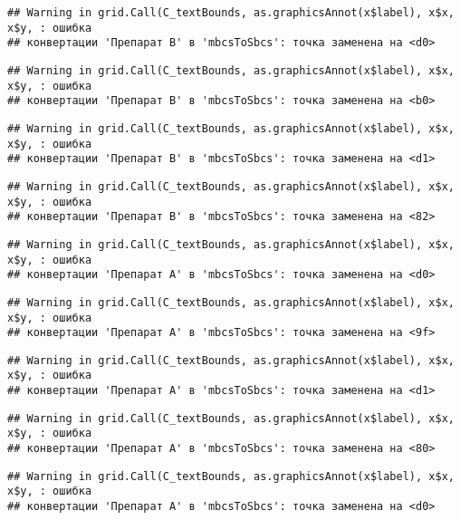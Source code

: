 \documentclass[
]{article}
\begin{document}
\begin{verbatim}
## Warning in grid.Call(C_textBounds, as.graphicsAnnot(x$label), x$x, x$y, : ошибка
## конвертации 'Препарат B' в 'mbcsToSbcs': точка заменена на <d0>
\end{verbatim}

\begin{verbatim}
## Warning in grid.Call(C_textBounds, as.graphicsAnnot(x$label), x$x, x$y, : ошибка
## конвертации 'Препарат B' в 'mbcsToSbcs': точка заменена на <b0>
\end{verbatim}

\begin{verbatim}
## Warning in grid.Call(C_textBounds, as.graphicsAnnot(x$label), x$x, x$y, : ошибка
## конвертации 'Препарат B' в 'mbcsToSbcs': точка заменена на <d1>
\end{verbatim}

\begin{verbatim}
## Warning in grid.Call(C_textBounds, as.graphicsAnnot(x$label), x$x, x$y, : ошибка
## конвертации 'Препарат B' в 'mbcsToSbcs': точка заменена на <82>
\end{verbatim}

\begin{verbatim}
## Warning in grid.Call(C_textBounds, as.graphicsAnnot(x$label), x$x, x$y, : ошибка
## конвертации 'Препарат A' в 'mbcsToSbcs': точка заменена на <d0>
\end{verbatim}

\begin{verbatim}
## Warning in grid.Call(C_textBounds, as.graphicsAnnot(x$label), x$x, x$y, : ошибка
## конвертации 'Препарат A' в 'mbcsToSbcs': точка заменена на <9f>
\end{verbatim}

\begin{verbatim}
## Warning in grid.Call(C_textBounds, as.graphicsAnnot(x$label), x$x, x$y, : ошибка
## конвертации 'Препарат A' в 'mbcsToSbcs': точка заменена на <d1>
\end{verbatim}

\begin{verbatim}
## Warning in grid.Call(C_textBounds, as.graphicsAnnot(x$label), x$x, x$y, : ошибка
## конвертации 'Препарат A' в 'mbcsToSbcs': точка заменена на <80>
\end{verbatim}

\begin{verbatim}
## Warning in grid.Call(C_textBounds, as.graphicsAnnot(x$label), x$x, x$y, : ошибка
## конвертации 'Препарат A' в 'mbcsToSbcs': точка заменена на <d0>
\end{verbatim}
\end{document}
